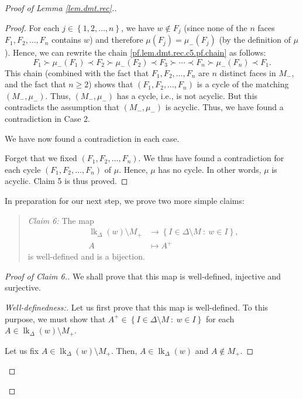 \documentclass[12pt]{amsart}
\theoremstyle{definition}
\newenvironment{statement}{\begin{quote}}{\end{quote}}
\DeclareMathOperator{\lk}{lk}
\begin{document}
\begin{proof}[Proof of Lemma \ref{lem.dmt.rec}.]
\begin{proof}
For each $j\in\left\{  1,2,\ldots,n\right\}  $, we have $w\notin F_{j}$ (since
none of the $n$ faces $F_{1},F_{2},\ldots,F_{n}$ contains $w$) and therefore
$\mu\left(  F_{j}\right)  =\mu_-\left(  F_{j}\right)  $ (by the definition
of $\mu$). Hence, we can rewrite the chain \eqref{pf.lem.dmt.rec.c5.pf.chain}
as follows:%
\[
F_{1}\succ\mu_-\left(  F_{1}\right)  \prec F_{2}\succ\mu_-\left(
F_{2}\right)  \prec F_{3}\succ\cdots\prec F_{n}\succ\mu_-\left(
F_{n}\right)  \prec F_{1}.
\]
This chain (combined with the fact that $F_{1},F_{2},\ldots,F_{n}$ are $n$
distinct faces in $M_-$, and the fact that $n\geq2$) shows that $\left(
F_{1},F_{2},\ldots,F_{n}\right)  $ is a cycle of the matching $\left(
M_-,\mu_-\right)  $. Thus, $\left(  M_-,\mu_-\right)  $ has a cycle,
i.e., is not acyclic. But this contradicts the assumption that $\left(
M_-,\mu_-\right)  $ is acyclic. Thus, we have found a contradiction in
Case 2.

We have now found a contradiction in each case.

Forget that we fixed $\left(  F_{1},F_{2},\ldots,F_{n}\right)  $. We thus have
found a contradiction for each cycle $\left(  F_{1},F_{2},\ldots,F_{n}\right)
$ of $\mu$. Hence, $\mu$ has no cycle. In other words, $\mu$ is acyclic. Claim
5 is thus proved.
\end{proof}

In preparation for our next step, we prove two more simple claims:

\begin{statement}
\textit{Claim 6:} The map%
\begin{align*}
\lk_{\Delta}\left(  w\right)  \setminus M_+  &
\rightarrow\left\{  I\in\Delta\setminus M\ :\ w\in I\right\}  ,\\
A  &  \mapsto A^+%
\end{align*}
is well-defined and is a bijection.
\end{statement}

\begin{proof}
[Proof of Claim 6.]We shall prove that this map is well-defined, injective and surjective.

\begin{proof}
[Well-definedness:]Let us first prove that this map is well-defined. To this
purpose, we must show that $A^+\in\left\{  I\in\Delta\setminus M\ :\ w\in
I\right\}  $ for each $A\in\lk_{\Delta}\left(  w\right)  \setminus M_+$.

Let us fix $A\in\lk_{\Delta}\left(  w\right)
\setminus M_+$. Then, $A\in\lk_{\Delta}\left(
w\right)  $ and $A\notin M_+$.


\end{proof}
\end{proof}
\end{proof}
\end{document}
